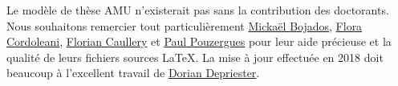 Le modèle de thèse AMU n'existerait pas sans la contribution des doctorants. Nous souhaitons remercier tout particulièrement \href{http://www.theses.fr/2011AIX20720}{Mickaël Bojados}, \href{http://www.theses.fr/2011AIX22111}{Flora Cordoleani}, \href{http://www.theses.fr/2014AIXM4013}{Florian Caullery} et \href{https://theses.fr/2023AIXM0574}{Paul Pouzergues} pour leur aide précieuse et la qualité de leurs fichiers sources LaTeX. La mise à jour effectuée en 2018 doit beaucoup à l'excellent travail de \href{http://theses.fr/2014ENMP0038}{Dorian Depriester}.

\lipsum[1-2]
